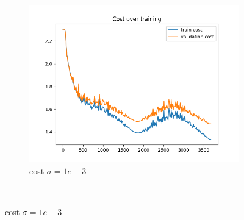 \documentclass[a4paper]{article}
\begin{document}
\begin{figure}[h]
\begin{subfigure}{0.3\textwidth}
		\includegraphics[width=\linewidth]{images/sens_sigma_0.001_use_bn_True_cost.png}
		\caption{cost $\sigma=1e-3$}
	\end{subfigure} \\
	

\end{figure}
\end{document}
